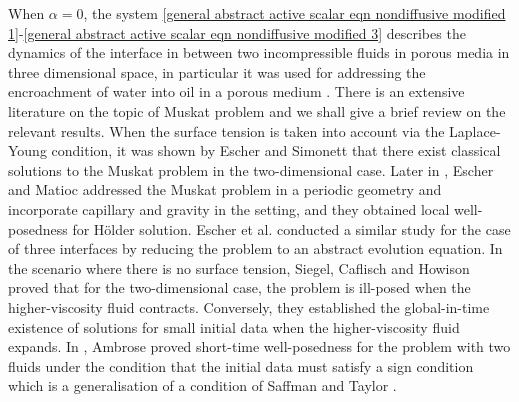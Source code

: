 \documentclass[reqno]{amsart}%
\theoremstyle{definition}
\theoremstyle{remark}
\numberwithin{equation}{section}
\newcommand{\0}{\mathbf{0}}
\newcommand{\1}{\mathbf{1}}
\numberwithin{equation}{section}
\numberwithin{theorem}{section}
\numberwithin{figure}{section}
\begin{document}
When $\alpha=0$, the system \eqref{general abstract active scalar eqn nondiffusive modified 1}-\eqref{general abstract active scalar eqn nondiffusive modified 3} describes the dynamics of the interface in between two incompressible fluids in porous media in three dimensional space, in particular it was used for addressing the encroachment of water into oil in a porous medium \cite{Musk37}. There is an extensive literature on the topic of Muskat problem and we shall give a brief review on the relevant results. When the surface tension is taken into account via the Laplace-Young condition, it was shown by Escher and Simonett \cite{ES97} that there exist classical solutions to the Muskat problem in the two-dimensional case. Later in \cite{EM11}, Escher and Matioc addressed the Muskat problem in a periodic geometry
and incorporate capillary and gravity in the setting, and they obtained local well-posedness for H\"{o}lder solution. Escher et al. \cite{EMV12} conducted a similar study for the case of three interfaces by reducing the problem to an abstract evolution equation. In the scenario where there is no surface tension, Siegel, Caflisch and Howison \cite{SCH04} proved that for the two-dimensional case, the problem is ill-posed when the higher-viscosity fluid contracts. Conversely, they established the global-in-time existence of solutions for small initial data when the higher-viscosity fluid expands. In \cite{AM04}, Ambrose proved short-time well-posedness for the problem with two fluids under the condition that the initial data must satisfy a sign condition which is a generalisation of a condition of Saffman and Taylor \cite{ST58}.
\end{document}
